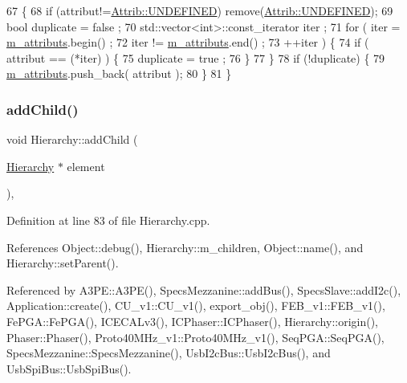 \begin{DoxyCode}
67                             \{
68     \textcolor{keywordflow}{if} (attribut!=\hyperlink{classAttrib_a69e171d7cc6417835a5a306d3c764235a3a8da2ab97dda18aebab196fe4100531}{Attrib::UNDEFINED}) \textcolor{keyword}{remove}(\hyperlink{classAttrib_a69e171d7cc6417835a5a306d3c764235a3a8da2ab97dda18aebab196fe4100531}{Attrib::UNDEFINED});
69     \textcolor{keywordtype}{bool} duplicate = false ;
70     std::vector<int>::const\_iterator iter ;
71     \textcolor{keywordflow}{for} ( iter  = \hyperlink{classAttrib_ac4bd58a0cc6b38a3b711d609a3d3aacc}{m\_attributs}.begin() ;
72           iter != \hyperlink{classAttrib_ac4bd58a0cc6b38a3b711d609a3d3aacc}{m\_attributs}.end()   ;
73           ++iter ) \{
74       \textcolor{keywordflow}{if} ( attribut == (*iter) ) \{
75         duplicate = true ;
76       \}
77     \}
78     \textcolor{keywordflow}{if} (!duplicate) \{
79       \hyperlink{classAttrib_ac4bd58a0cc6b38a3b711d609a3d3aacc}{m\_attributs}.push\_back( attribut );
80     \}
81   \}
\end{DoxyCode}
\mbox{\label{classHierarchy_ad677774ff38fcb257c04a3a10d471fac}} 
\subsubsection{\texorpdfstring{add\+Child()}{addChild()}}
{\footnotesize\ttfamily void Hierarchy\+::add\+Child (\begin{DoxyParamCaption}\item[{\hyperlink{classHierarchy}{Hierarchy} $\ast$}]{element }\end{DoxyParamCaption})\hspace{0.3cm}{\ttfamily [virtual]}, {\ttfamily [inherited]}}



Definition at line 83 of file Hierarchy.\+cpp.



References Object\+::debug(), Hierarchy\+::m\+\_\+children, Object\+::name(), and Hierarchy\+::set\+Parent().



Referenced by A3\+P\+E\+::\+A3\+P\+E(), Specs\+Mezzanine\+::add\+Bus(), Specs\+Slave\+::add\+I2c(), Application\+::create(), C\+U\+\_\+v1\+::\+C\+U\+\_\+v1(), export\+\_\+obj(), F\+E\+B\+\_\+v1\+::\+F\+E\+B\+\_\+v1(), Fe\+P\+G\+A\+::\+Fe\+P\+G\+A(), I\+C\+E\+C\+A\+Lv3(), I\+C\+Phaser\+::\+I\+C\+Phaser(), Hierarchy\+::origin(), Phaser\+::\+Phaser(), Proto40\+M\+Hz\+\_\+v1\+::\+Proto40\+M\+Hz\+\_\+v1(), Seq\+P\+G\+A\+::\+Seq\+P\+G\+A(), Specs\+Mezzanine\+::\+Specs\+Mezzanine(), Usb\+I2c\+Bus\+::\+Usb\+I2c\+Bus(), and Usb\+Spi\+Bus\+::\+Usb\+Spi\+Bus().


